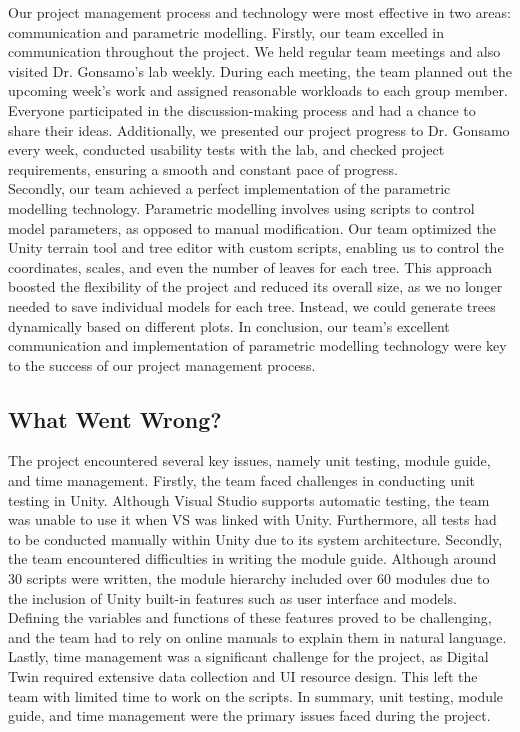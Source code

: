 \documentclass{article}
\begin{document}
Our project management process and technology were most effective in two areas: communication and parametric modelling. Firstly, our team excelled in communication throughout the project. We held regular team meetings and also visited Dr. Gonsamo's lab weekly. During each meeting, the team planned out the upcoming week's work and assigned reasonable workloads to each group member. Everyone participated in the discussion-making process and had a chance to share their ideas. Additionally, we presented our project progress to Dr. Gonsamo every week, conducted usability tests with the lab, and checked project requirements, ensuring a smooth and constant pace of progress.\\

Secondly, our team achieved a perfect implementation of the parametric modelling technology. Parametric modelling involves using scripts to control model parameters, as opposed to manual modification. Our team optimized the Unity terrain tool and tree editor with custom scripts, enabling us to control the coordinates, scales, and even the number of leaves for each tree. This approach boosted the flexibility of the project and reduced its overall size, as we no longer needed to save individual models for each tree. Instead, we could generate trees dynamically based on different plots. In conclusion, our team's excellent communication and implementation of parametric modelling technology were key to the success of our project management process.\\

\subsection{What Went Wrong?}


  \noindent The project encountered several key issues, namely unit testing, module guide, and time management. Firstly, the team faced challenges in conducting unit testing in Unity. Although Visual Studio supports automatic testing, the team was unable to use it when VS was linked with Unity. Furthermore, all tests had to be conducted manually within Unity due to its system architecture. Secondly, the team encountered difficulties in writing the module guide. Although around 30 scripts were written, the module hierarchy included over 60 modules due to the inclusion of Unity built-in features such as user interface and models. Defining the variables and functions of these features proved to be challenging, and the team had to rely on online manuals to explain them in natural language. Lastly, time management was a significant challenge for the project, as Digital Twin required extensive data collection and UI resource design. This left the team with limited time to work on the scripts. In summary, unit testing, module guide, and time management were the primary issues faced during the project.
\end{document}
